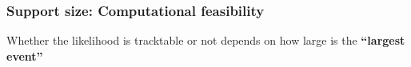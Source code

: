 \documentclass[aspectratio=169,9pt,handout]{beamer}
\begin{document}
\begin{frame}
\begin{minipage}[t]{.3\linewidth}
	\end{minipage}\hfill
	\begin{minipage}[t]{.3\linewidth}
		\centering
	\end{minipage}
	\vfill\hfill{}
	
\end{frame}

\begin{frame}
	\frametitle{Support size: Computational feasibility}
	Whether the likelihood is tracktable or not depends on how large is the \textbf{``largest event''}
	\begin{figure}
	\end{figure}
\end{frame}
\end{document}
